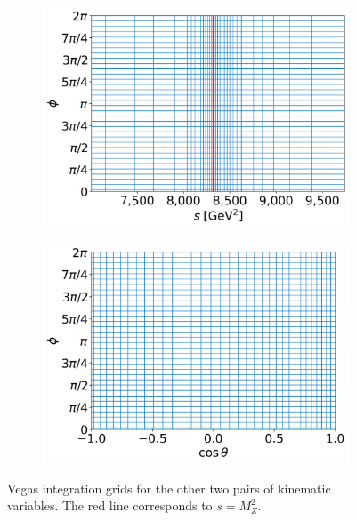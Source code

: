 \begin{figure}[ht!]
     \centering
     \begin{subfigure}[t]{0.49\textwidth}
         \centering
         \includegraphics[width=\textwidth]{figures/integration_grid_1.png}
         \caption{}
         \label{fig:app-integration-grid1}
     \end{subfigure}
     \hfill
     \begin{subfigure}[t]{0.49\textwidth}
         \centering
         \includegraphics[width=\textwidth]{figures/integration_grid_2.png}
         \caption{}
         \label{fig:app-integration-grid2}
     \end{subfigure}
        \caption{Vegas integration grids for the other two pairs of kinematic variables. The red line corresponds to $s = M_{Z}^{2}$.}
        \label{fig:app-integration-grids}
\end{figure}
